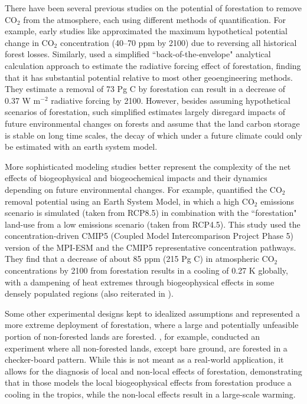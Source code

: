 \documentclass[draft]{agujournal2019}
\begin{document}
There have been several previous studies on the potential of forestation to remove CO$_2$ from the atmosphere, each using different methods of quantification.
For example, early studies like  approximated the maximum hypothetical potential change in CO$_2$ concentration (40--70 ppm by 2100) due to reversing all historical forest losses. Similarly,  used a simplified ``back-of-the-envelope" analytical calculation approach to estimate the radiative forcing effect of forestation, finding that it has substantial potential relative to most other geoengineering methods.
They estimate a removal of 73 Pg C by forestation can result in a decrease of 0.37 W m$^{-2}$ radiative forcing by 2100.
However, besides assuming hypothetical scenarios of forestation, such simplified estimates largely disregard impacts of future environmental changes on forests and assume that the land carbon storage is stable on long time scales, the decay of which under a future climate could only be estimated with an earth system model.

More sophisticated modeling studies better represent the complexity of the net effects of biogeophysical and biogeochemical impacts and their dynamics depending on future environmental changes.
For example,  quantified the CO$_2$ removal potential using an Earth System Model, in which a high CO$_2$ emissions scenario is simulated (taken from RCP8.5) in combination with the ``forestation" land-use from a low emissions scenario (taken from RCP4.5).
This study used the concentration-driven CMIP5 (Coupled Model Intercomparison Project Phase 5) version of the MPI-ESM and the CMIP5 representative concentration pathways.
They find that a decrease of about 85 ppm (215 Pg C) in atmospheric CO$_2$ concentrations by 2100 from forestation results in a cooling of 0.27 K globally, with a dampening of heat extremes through biogeophysical effects in some densely populated regions (also reiterated in ).

Some other experimental designs kept to idealized assumptions and represented a more extreme deployment of forestation, where a large and potentially unfeasible portion of non-forested lands are forested.
, for example, conducted an experiment where all non-forested lands, except bare ground, are forested in a checker-board pattern.
While this is not meant as a real-world application, it allows for the diagnosis of local and non-local effects of forestation, demonstrating that in those models the local biogeophysical effects from forestation produce a cooling in the tropics, while the non-local effects result in a large-scale warming.
\end{document}
